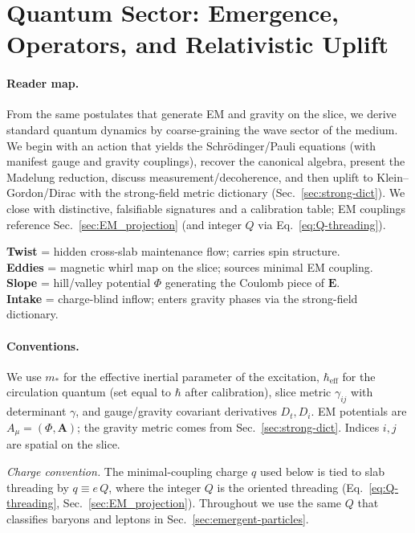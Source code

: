 \section{Quantum Sector: Emergence, Operators, and Relativistic Uplift}
\label{sec:QM_projection}

\paragraph{Reader map.}
From the same postulates that generate EM and gravity on the slice, we derive standard quantum dynamics by coarse-graining the wave sector of the medium. We begin with an action that yields the Schr\"odinger/Pauli equations (with manifest gauge and gravity couplings), recover the canonical algebra, present the Madelung reduction, discuss measurement/decoherence, and then uplift to Klein--Gordon/Dirac with the strong-field metric dictionary (Sec.~\ref{sec:strong-dict}). We close with distinctive, falsifiable signatures and a calibration table; EM couplings reference Sec.~\ref{sec:EM_projection} (and integer $Q$ via Eq.~\eqref{eq:Q-threading}).

\begin{tcolorbox}[title=Terminology bridge (QM)]
\textbf{Twist} = hidden cross-slab maintenance flow; carries spin structure. \\
\textbf{Eddies} = magnetic whirl map on the slice; sources minimal EM coupling. \\
\textbf{Slope} = hill/valley potential \(\Phi\) generating the Coulomb piece of \(\mathbf E\). \\
\textbf{Intake} = charge-blind inflow; enters gravity phases via the strong-field dictionary.
\end{tcolorbox}

\paragraph{Conventions.}
We use \(m_*\) for the effective inertial parameter of the excitation, \(\hbar_{\mathrm{eff}}\) for the circulation quantum (set equal to \(\hbar\) after calibration), slice metric \(\gamma_{ij}\) with determinant \(\gamma\), and gauge/gravity covariant derivatives \(D_t, D_i\). EM potentials are \(A_\mu=(\Phi,\mathbf A)\); the gravity metric comes from Sec.~\ref{sec:strong-dict}. Indices \(i,j\) are spatial on the slice.

\noindent\emph{Charge convention.} The minimal-coupling charge \(q\) used below is tied to slab threading by \(q \equiv e\,Q\), where the integer \(Q\) is the oriented threading (Eq.~\eqref{eq:Q-threading}, Sec.~\ref{sec:EM_projection}). Throughout we use the same \(Q\) that classifies baryons and leptons in Sec.~\ref{sec:emergent-particles}.

